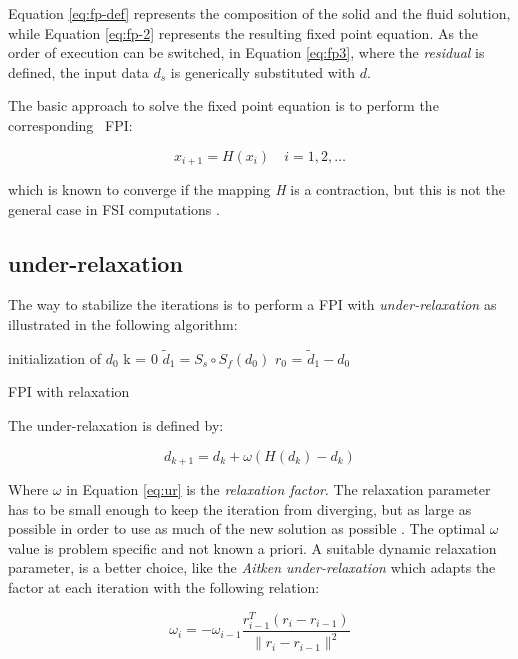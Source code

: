 Equation \ref{eq:fp-def} represents the composition of the solid and the fluid solution, while Equation \ref{eq:fp-2} represents the resulting fixed point equation. As the order of execution can be switched, in Equation \ref{eq:fp3}, where the \textit{residual} is defined, the input data $d_s$ is generically substituted with $d$.

The basic approach to solve the fixed point equation is to perform the corresponding ~\ac{FPI}:

\begin{equation}
	x_{i+1} = H(x_i) \quad i=1,2,\ldots
\end{equation} 

which is known to converge if the mapping \textit{H} is a contraction, but this is not the general case in FSI computations \cite{mehl2016parallel}. 

\subsection{under-relaxation}

The way to stabilize the iterations is to perform a FPI with \textit{under-relaxation} as illustrated in the following algorithm:

\begin{algorithm}[H]
	\SetAlgoLined
	initialization of $d_0$\;
	k = 0\;
	$\tilde{d}_1 = S_s \circ S_f(d_0)$\;
	$r_0$ = $\tilde{d}_1 - d_0$\;
	\caption{FPI with relaxation}
\end{algorithm}

The under-relaxation is defined by:

\begin{equation}
	d_{k+1} = d_{k} + \omega \left( H(d_k)  - d_k  \right)
	\label{eq:ur}
\end{equation} 

Where $\omega$ in Equation \ref{eq:ur} is the \textit{relaxation factor}. The relaxation parameter has to be small enough to keep the iteration from diverging, but as large as possible in order to use as much of the new solution as possible \cite{kuttler2008fixed}. The optimal $\omega$ value is problem specific and not known a priori.
A suitable dynamic relaxation parameter, is a better choice, like the \textit{Aitken under-relaxation} \cite{irons1969version} which adapts the factor at each iteration with the following relation:

\begin{equation}
	\omega_i = -\omega_{i-1} \frac{r_{i-1}^T \left(r_i - r_{i-1}\right)}{ \lVert r_i - r_{i-1} \rVert ^2}
\end{equation}

